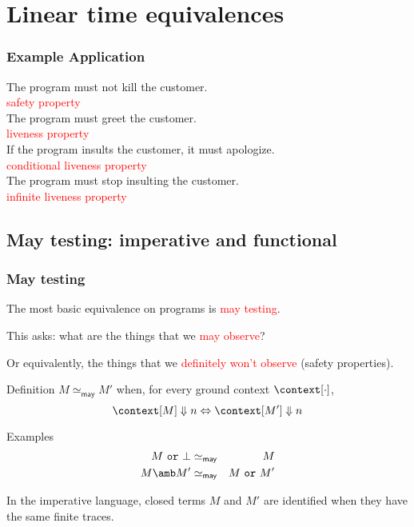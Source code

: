 \documentclass{beamer}
\newcommand{\ttor}{\ \mathtt{or}\ }
\newcommand{\may}{\mathsf{may}}
\newcommand{\red}[1]{\textcolor{red}{#1}}
\begin{document}

\section{Linear time equivalences}


 \begin{frame}\frametitle{Example Application}

\pause

The program must not kill the customer.\\ \pause \red{safety property} \\
\medskip
\pause
The program must greet the customer.  \\ \pause \red{liveness property} \\
\medskip 
\pause
If the program insults the customer, it must apologize. \\ \pause \red{conditional liveness property} \\
\medskip
\pause
The program must stop insulting the customer. \\ \pause \red{infinite liveness property} \\



 \end{frame} 

\subsection{May testing: imperative and functional}

\begin{frame}\frametitle{May testing}

The most basic equivalence on programs is \red{may testing}.

This asks: what are the things that we \red{may observe}?

Or equivalently, the things that we \red{definitely won't observe} (safety properties).
\pause

\begin{block}{Definition}
  $M \simeq_{\may} M'$ when, for every ground context $\context[\cdot]$,
\begin{displaymath}
  \context[M] \Downarrow n \Leftrightarrow \context[M'] \Downarrow n
\end{displaymath}
\end{block}


\begin{block}{Examples}
\begin{eqnarray*}
  M \ttor \bot & \simeq_{\may} & M \\
M \amb M' & \simeq_{\may} & M \ttor M'
\end{eqnarray*}
\end{block}

In the imperative language, closed terms $M$ and $M'$ are identified when they have the same finite traces.  

\end{frame}
\end{document}
